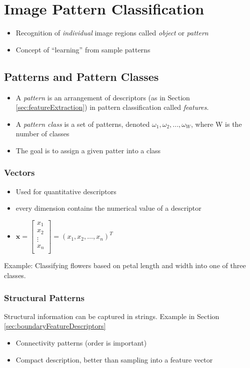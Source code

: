 \section{Image Pattern Classification}
\begin{itemize}
\item Recognition of \emph{individual} image regions called \emph{object} or \emph{pattern}
\item Concept of ``learning'' from sample patterns
\end{itemize}

\subsection{Patterns and Pattern Classes}
\begin{itemize}
	\item A \emph{pattern} is an arrangement of descriptors
		(as in Section \ref{sec:featureExtraction}) in pattern classification
		called \emph{features}.
	\item A \emph{pattern class} is a set of patterns, denoted $\omega_1, \omega_2, ..., \omega_W$, where W is the number of classes
	\item The goal is to assign a given patter into a class
\end{itemize}

\subsubsection{Vectors}
\begin{itemize}
	\item Used for quantitative descriptors
	\item every dimension contains the numerical value of a descriptor
	\item $\mathbf{x} =
		\begin{bmatrix}
			x_1 \\
			x_2 \\
			\vdots \\
			x_n \\
		\end{bmatrix}
		 = (x_1, x_2, \ldots, x_n)^T $
\end{itemize}
Example: Classifying flowers based on petal length and width into one of three classes.

\subsubsection{Structural Patterns}
Structural information can be captured in strings. Example in Section \ref{sec:boundaryFeatureDescriptors} 
\begin{itemize}
	\item Connectivity patterns (order is important)
	\item Compact description, better than sampling into a feature vector
\end{itemize}

